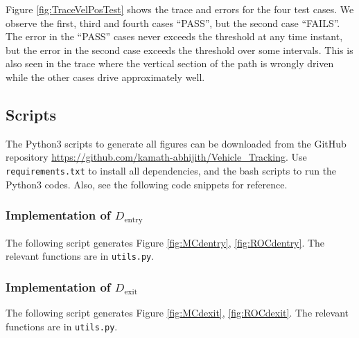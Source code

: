 \documentclass[11pt]{article}
\begin{document}
Figure \ref{fig:TraceVelPosTest} shows the trace and errors for the four test cases. We observe the first, third and fourth cases ``PASS'', but the second case ``FAILS''. The error in the ``PASS'' cases never exceeds the threshold at any time instant, but the error in the second case exceeds the threshold over some intervals. This is also seen in the trace where the vertical section of the path is wrongly driven while the other cases drive approximately well.


\clearpage
\appendix

\subsection*{Scripts}

The Python3 scripts to generate all figures can be downloaded from the GitHub repository \url{https://github.com/kamath-abhijith/Vehicle_Tracking}. Use \texttt{requirements.txt} to install all dependencies, and the bash scripts to run the Python3 codes. Also, see the following code snippets for reference.

\subsubsection*{Implementation of $D_{\text{entry}}$}

The following script generates Figure \ref{fig:MCdentry}, \ref{fig:ROCdentry}. The relevant functions are in \texttt{utils.py}.



\subsubsection*{Implementation of $D_{\text{exit}}$}

The following script generates Figure \ref{fig:MCdexit}, \ref{fig:ROCdexit}. The relevant functions are in \texttt{utils.py}.


\end{document}
